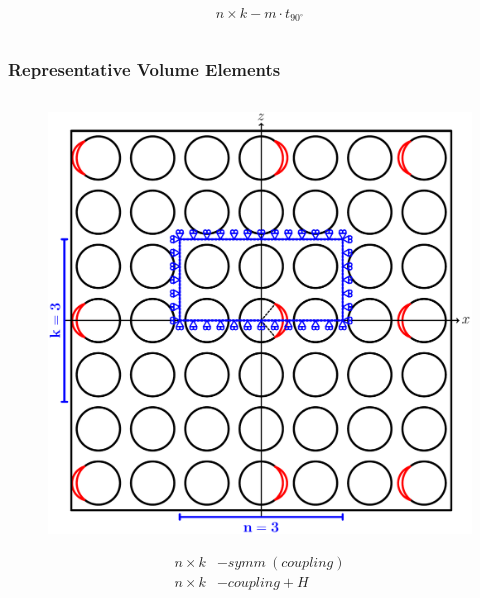 \documentclass[first,firstsupp,lastsupp,last,hyperref,table]{ETHclass}
\begin{document}
\begin{frame}
\begin{columns}[c]
\begin{column}{0.45\textwidth}
\begin{figure}
\end{figure}
\vspace{-0.25cm}
\begin{equation*}
n\times  k-m\cdot t_{90^{\circ}}
\end{equation*}
\end{column}
\end{columns}
\end{frame}

\addtocounter{framenumber}{-1}

\begin{frame}
\frametitle{\vspace{0.2cm}\small Representative Volume Elements}
\vspace{-0.9cm}
\centering
\begin{columns}[c]
\begin{column}{0.5\textwidth}
\centering
\begin{figure}
\centering
\includegraphics[width=\columnwidth]{coupling.pdf}
\end{figure}
\vspace{-0.275cm}
\begin{equation*}
\begin{split}
n\times k&-symm\ (coupling)\\
n\times k&-coupling+H
\end{split}
\end{equation*}

\end{column}
\end{columns}
\end{frame}
\end{document}
